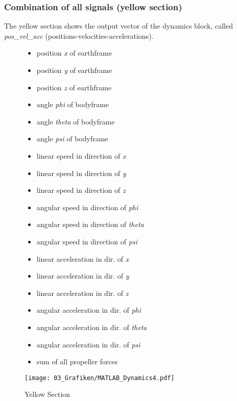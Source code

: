 \subsubsection{Combination of all signals (yellow section)}\label{chapter_YELLOW_SECTION}
The yellow section shows the output vector of the dynamics block, called \textit{pos\_vel\_acc} (positions-velocities-accelerations).
\begin{figure}[htbp]
	\begin{minipage}[t]{8cm}
		\vspace{0pt}
		\begin{singlespace}
			\medskip
			\medskip
			\medskip
			\begin{itemize}
			\item position \textit{x} of earthframe
			\item position \textit{y} of earthframe
			\item position \textit{z} of earthframe
			\item angle \textit{phi} of bodyframe
			\item angle \textit{theta} of bodyframe
			\item angle \textit{psi} of bodyframe
			\item linear speed in direction of \textit{x}
			\item linear speed in direction of \textit{y}
			\item linear speed in direction of \textit{z}
			\item angular speed in direction of \textit{phi}
			\item angular speed in direction of \textit{theta}
			\item angular speed in direction of \textit{psi}
			\item linear acceleration in dir. of \textit{x}
			\item linear acceleration in dir. of \textit{y}
			\item linear acceleration in dir. of \textit{z}
			\item angular acceleration in dir. of \textit{phi}
			\item angular acceleration in dir. of \textit{theta}
			\item angular acceleration in dir. of \textit{psi}
			\item sum of all propeller forces
			\end{itemize}
		\end{singlespace}
	\end{minipage}
	\hfill
	\begin{minipage}[t]{6.5cm}
		\vspace{0pt}
		\centering
		\texttt{[image: 03\_Grafiken/MATLAB\_Dynamics4.pdf]}
		\caption{Yellow Section}
		\label{fig:MATLAB Dynamics4}
	\end{minipage}
\end{figure}